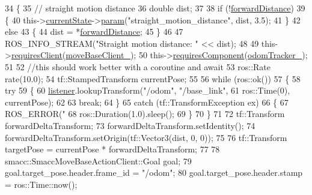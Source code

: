 \begin{DoxyCode}
34     \{
35         \textcolor{comment}{// straight motion distance}
36         \textcolor{keywordtype}{double} dist;
37 
38         \textcolor{keywordflow}{if} (!\hyperlink{classSbNavigateForward_adc99629f937c3d43fa56a59ca16f9aee}{forwardDistance})
39         \{
40             this->\hyperlink{classsmacc_1_1SmaccSubStateBehavior_a62e2b9da4a446f09396d0b4c01659b88}{currentState}->\hyperlink{classsmacc_1_1ISmaccState_a4982f2187ed6da337462721146e8ef70}{param}(\textcolor{stringliteral}{"straight\_motion\_distance"}, dist, 3.5);
41         \}
42         \textcolor{keywordflow}{else}
43         \{
44             dist = *\hyperlink{classSbNavigateForward_adc99629f937c3d43fa56a59ca16f9aee}{forwardDistance};
45         \}
46 
47         ROS\_INFO\_STREAM(\textcolor{stringliteral}{"Straight motion distance: "} << dist);
48 
49         this->\hyperlink{classsmacc_1_1SmaccSubStateBehavior_ae8361a9e794b02f9f3d962b881e4fd7d}{requiresClient}(\hyperlink{classSbNavigateForward_a6c3b305bdf4a637dad4d80b456575a36}{moveBaseClient\_});
50         this->\hyperlink{classsmacc_1_1SmaccSubStateBehavior_a9f31f62f886cc06017e92fa0d834b12d}{requiresComponent}(\hyperlink{classSbNavigateForward_ac45353a2cfde3c3d2c802065ed1419fc}{odomTracker\_});
51 
52         \textcolor{comment}{//this should work better with a coroutine and await}
53         ros::Rate rate(10.0);
54         tf::StampedTransform currentPose;
55 
56         \textcolor{keywordflow}{while} (ros::ok())
57         \{
58             \textcolor{keywordflow}{try}
59             \{
60                 \hyperlink{classSbNavigateForward_acdf8c63e8a81587ef0b419c94e3b6a4d}{listener}.lookupTransform(\textcolor{stringliteral}{"/odom"}, \textcolor{stringliteral}{"/base\_link"}, 
61                                          ros::Time(0), currentPose);
62 
63                 \textcolor{keywordflow}{break};
64             \}
65             \textcolor{keywordflow}{catch} (tf::TransformException ex)
66             \{
67                 ROS\_ERROR(\textcolor{stringliteral}{"%
68                 ros::Duration(1.0).sleep();
69             \}
70         \}
71 
72         tf::Transform forwardDeltaTransform;
73         forwardDeltaTransform.setIdentity();
74         forwardDeltaTransform.setOrigin(tf::Vector3(dist, 0, 0));
75 
76         tf::Transform targetPose = currentPose * forwardDeltaTransform;
77 
78         smacc::SmaccMoveBaseActionClient::Goal goal;
79         goal.target\_pose.header.frame\_id = \textcolor{stringliteral}{"/odom"};
80         goal.target\_pose.header.stamp = ros::Time::now();
}
\end{DoxyCode}
